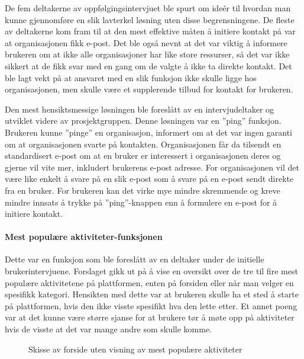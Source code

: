 De fem deltakerne av oppfølgingsintervjuet ble spurt om ideér til hvordan man kunne gjennomføre en slik lavterkel løsning uten disse begrensningene. De fleste av deltakerne kom fram til at den mest effektive måten å initiere kontakt på var at organisasjonen fikk e-post. Det ble også nevnt at det var viktig å informere brukeren om at ikke alle organisasjoner har like store ressurser, så det var ikke sikkert at de fikk svar med en gang om de valgte å ikke ta direkte kontakt. Det ble lagt vekt på at ansvaret med en slik funksjon ikke skulle ligge hos organisasjonen, men skulle være et supplerende tilbud for kontakt for brukeren. 

Den mest hensiktsmessige løsningen ble foreslått av en intervjudeltaker og utviklet videre av prosjektgruppen. Denne løsningen var en ''ping'' funksjon. Brukeren kunne ''pinge'' en organisasjon, informert om at det var ingen garanti om at organisasjonen svarte på kontakten. Organisasjonen får da tilsendt en standardisert e-post om at en bruker er interessert i organisasjonen deres og gjerne vil vite mer, inkludert brukerens e-post adresse. For organisasjonen vil det være like enkelt å svare på en slik e-post som å svare på en e-post sendt direkte fra en bruker. For brukeren kan det virke mye mindre skremmende og kreve mindre innsats å trykke på ''ping''-knappen enn å formulere en e-post for å initiere kontakt.

\paragraph{Mest populære aktiviteter-funksjonen}
Dette var en funksjon som ble foreslått av en deltaker under de initielle brukerintervjuene. Forslaget gikk ut på å vise en oversikt over de tre til fire mest populære aktivitetene på plattformen, enten på forsiden eller når man velger en spesifikk kategori. Hensikten med dette var at brukeren skulle ha et sted å starte på plattformen, hvis den ikke visste spesifikt hva den lette etter. Et annet poeng var at det kunne være større sjanse for at brukere tør å møte opp på aktiviteter hvis de visste at det var mange andre som skulle komme.

\begin{figure}[H]
\caption{Skisse av forside uten visning av mest populære aktiviteter}
\label{fig:utenMestPopulaere}
\end{figure}

